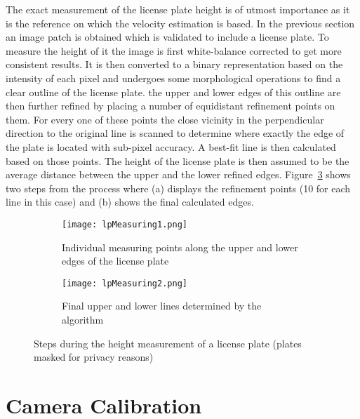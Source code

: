 The exact measurement of the license plate height is of utmost importance as it is the reference on which the velocity estimation is based.
In the previous section an image patch is obtained which is validated to include a license plate.
To measure the height of it the image is first white-balance corrected to get more consistent results.
It is then converted to a binary representation based on the intensity of each pixel and undergoes some morphological operations to find a clear outline of the license plate.
the upper and lower edges of this outline are then further refined by placing a number of equidistant refinement points on them.
For every one of these points the close vicinity in the perpendicular direction to the original line is scanned to determine where exactly the edge of the plate is located with sub-pixel accuracy.
A best-fit line is then calculated based on those points.
The height of the license plate is then assumed to be the average distance between the upper and the lower refined edges.
Figure~\ref{fig:lpMeasuring} shows two steps from the process where (a) displays the refinement points (10 for each line in this case) and (b) shows the final calculated edges.


\begin{figure}
    \centering
    \begin{subfigure}{.47\textwidth}
        \centering
        \texttt{[image: lpMeasuring1.png]}
        \caption{Individual measuring points along the upper and lower edges of the license plate}
        \label{fig:lpMeasuring1.png}
    \end{subfigure}%
    \hspace{.05\textwidth}
    \begin{subfigure}{.47\textwidth}
        \centering
        \texttt{[image: lpMeasuring2.png]}
        \caption{Final upper and lower lines determined by the algorithm}
        \label{fig:lpMeasuring2.png}
    \end{subfigure}
    \caption[Steps during the height measurement of a license plate]{Steps during the height measurement of a license plate (plates masked for privacy reasons)}
    \label{fig:lpMeasuring}
\end{figure}


\section{Camera Calibration}

